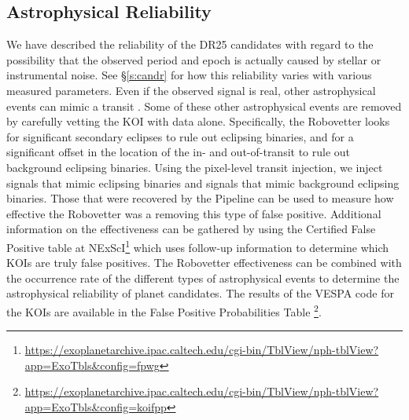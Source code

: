 
\subsection{Astrophysical Reliability}
We have described the reliability of the DR25 candidates with regard to the possibility that the observed period and epoch is actually caused by stellar or instrumental noise. See \S\ref{s:candr} for how this reliability varies with various measured parameters.  Even if the observed signal is real, other astrophysical events can mimic a transit \citep{Morton2016}. Some of these other astrophysical events are removed by carefully vetting the KOI with \Kepler{} data alone.  Specifically, the Robovetter looks for significant secondary eclipses to rule out eclipsing binaries, and for a significant offset in the location of the in- and out-of-transit to rule out background eclipsing binaries.  Using the pixel-level transit injection, we inject signals that mimic eclipsing binaries and signals that mimic background eclipsing binaries. Those that were recovered by the \Kepler{} Pipeline can be used to measure how effective the Robovetter was a removing this type of false positive. Additional information on the effectiveness can be gathered by using the Certified False Positive table at NExScI\footnote{\url{https://exoplanetarchive.ipac.caltech.edu/cgi-bin/TblView/nph-tblView?app=ExoTbls\&config=fpwg}} which uses follow-up information to determine which KOIs are truly false positives. The Robovetter effectiveness can be combined with the occurrence rate of the different types of astrophysical events to determine the astrophysical reliability of planet candidates. The results of the VESPA code \citep[][]{Morton2016} for the KOIs are available in the False Positive Probabilities Table \footnote{\url{https://exoplanetarchive.ipac.caltech.edu/cgi-bin/TblView/nph-tblView?app=ExoTbls\&config=koifpp}}.

